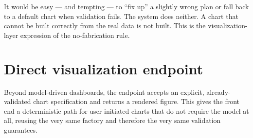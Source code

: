 \begin{uawarn}
It would be easy --- and tempting --- to ``fix up'' a slightly wrong plan or
fall back to a default chart when validation fails. The system does neither. A
chart that cannot be built correctly from the real data is not built. This is
the visualization-layer expression of the no-fabrication rule.
\end{uawarn}

\section{Direct visualization endpoint}
Beyond model-driven dashboards, the  endpoint accepts an
explicit, already-validated chart specification and returns a rendered figure.
This gives the front end a deterministic path for user-initiated charts that do
not require the model at all, reusing the very same factory and therefore the
very same validation guarantees.
